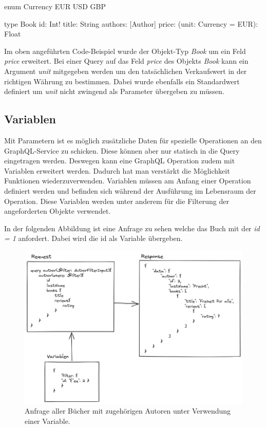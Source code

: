 \begin{JsCode}
enum Currency {
    EUR
    USD
    GBP
}

type Book {
    id: Int!
    title: String
    authors: [Author]
    price: (unit: Currency = EUR): Float
}
\end{JsCode}

Im oben angeführten Code-Beispiel wurde der Objekt-Typ \textit{Book} um ein Feld \textit{price} erweitert.
Bei einer Query auf das Feld \textit{price} des Objekts \textit{Book} kann ein Argument \textit{unit} mitgegeben werden um den tatsächlichen Verkaufswert in der richtigen Währung zu bestimmen.
Dabei wurde ebenfalls ein Standardwert definiert um \textit{unit} nicht zwingend als Parameter übergeben zu müssen.
\parencite[S.62]{kress2020graphql}


\subsection{Variablen}
Mit Parametern ist es möglich zusätzliche Daten für spezielle Operationen an den GraphQL-Service zu schicken.
Diese können aber nur statisch in die Query eingetragen werden.
Deswegen kann eine GraphQL Operation zudem mit Variablen erweitert werden.
Dadurch hat man verstärkt die Möglichkeit Funktionen wiederzuverwenden.
Variablen müssen am Anfang einer Operation definiert werden und befinden sich während der Ausführung im Lebensraum der Operation.
Diese Variablen werden unter anderem für die Filterung der angeforderten Objekte verwendet.
\parencite[Abs. 5.8]{graphqlOnline}
\newline

In der folgenden Abbildung ist eine Anfrage zu sehen welche das Buch mit der \textit{id = 1} anfordert. Dabei wird die id als Variable übergeben.

\begin{figure}[H]
    \includegraphics[width=\textwidth]{pics/book_request_with_parameter.png}
    \caption{Anfrage aller Bücher mit zugehörigen Autoren unter Verwendung einer Variable.}
\end{figure}

